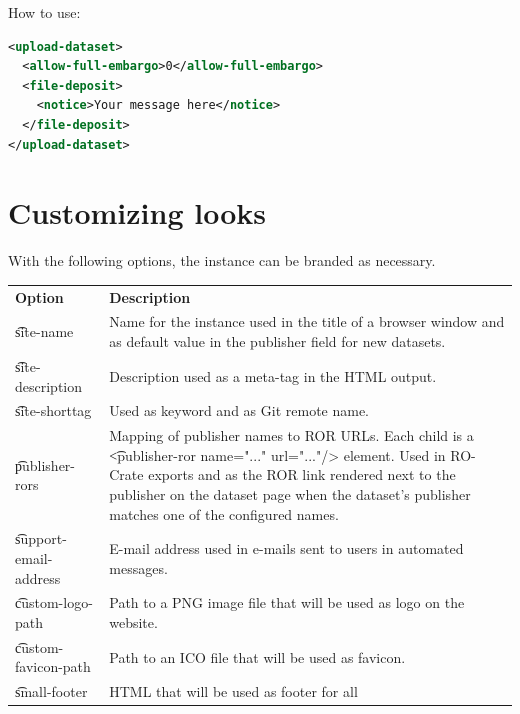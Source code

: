   How to use:

\begin{lstlisting}[language=xml]
<upload-dataset>
  <allow-full-embargo>0</allow-full-embargo>
  <file-deposit>
    <notice>Your message here</notice>
  </file-deposit>
</upload-dataset>
\end{lstlisting}

\section{Customizing looks}

  With the following options, the instance can be branded as necessary.

\begin{tabularx}{\textwidth}{*{1}{!{\VRule[-1pt]}l}!{\VRule[-1pt]}X}
  \headrow
  \textbf{Option}             & \textbf{Description}\\
  \t{site-name}               & Name for the instance used in the title of a
                                browser window and as default value in the
                                publisher field for new datasets.\\
  \t{site-description}        & Description used as a meta-tag in the HTML
                                output.\\
  \t{site-shorttag}           & Used as keyword and as Git remote name.\\
  \t{publisher-rors}          & Mapping of publisher names to ROR URLs.
                                Each child is a
                                \t{<publisher-ror name="..." url="..."/>}
                                element. Used in RO-Crate exports and as
                                the ROR link rendered next to the publisher
                                on the dataset page when the dataset's
                                publisher matches one of the configured
                                names.\\
  \t{support-email-address}   & E-mail address used in e-mails sent to users
                                in automated messages.\\
  \t{custom-logo-path}        & Path to a PNG image file that will be used as
                                logo on the website.\\
  \t{custom-favicon-path}     & Path to an ICO file that will be used as
                                favicon.\\
  \t{small-footer}            & HTML that will be used as footer for all

\end{tabularx}
